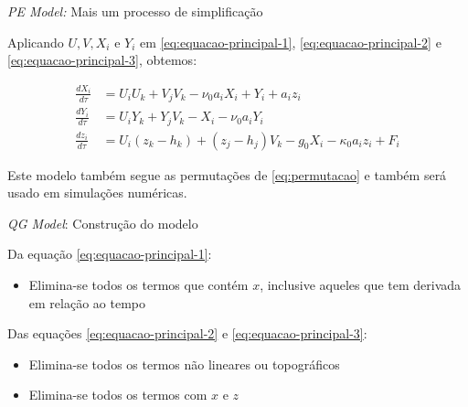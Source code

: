 
\begin{frame}{\textit{PE Model:} Mais um processo de simplificação}

Aplicando $U, V, X_i$ e $Y_i$ em \eqref{eq:equacao-principal-1}, \eqref{eq:equacao-principal-2} e \eqref{eq:equacao-principal-3}, obtemos:

\begin{align}
    \frac{dX_i}{d\tau} &= U_iU_k + V_jV_k - \nu_0a_iX_i + Y_i + a_iz_i \label{eq:equacao-principal-simplificada-1}\\
    \frac{dY_i}{d\tau} &= U_iY_k + Y_jV_k - X_i - \nu_0a_iY_i \label{eq:equacao-principal-simplificada-2}\\
    \frac{dz_i}{d\tau} &= U_i(z_k - h_k) + (z_j - h_j)V_k - g_0X_i - \kappa_0a_iz_i + F_i \label{eq:equacao-principal-simplificada-3}
\end{align}

Este modelo também segue as permutações de \eqref{eq:permutacao} e também será usado em simulações numéricas.

\end{frame}


\begin{frame}{\textit{QG Model}: Construção do modelo}

Da equação \eqref{eq:equacao-principal-1}:
\begin{itemize}
    \item Elimina-se todos os termos que contém $x$, inclusive aqueles que tem derivada em relação ao tempo
\end{itemize}

Das equações \eqref{eq:equacao-principal-2} e \eqref{eq:equacao-principal-3}:
\begin{itemize}
    \item Elimina-se todos os termos não lineares ou topográficos 
    \item Elimina-se todos os termos com $x$ e $z$
\end{itemize}

\end{frame}


